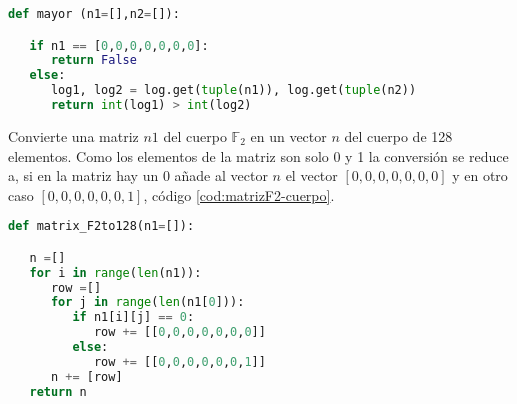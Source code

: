 \vspace{0.25cm}

\begin{lstlisting}[language=Python,caption=Compara dos elementos del cuerpo, label=cod:mayor-que-cuerpo]
def mayor (n1=[],n2=[]):

   if n1 == [0,0,0,0,0,0,0]:
      return False
   else:
      log1, log2 = log.get(tuple(n1)), log.get(tuple(n2))
      return int(log1) > int(log2)
\end{lstlisting}
 


Convierte una matriz $n1$ del cuerpo $\mathds{F}_2$ en un vector $n$ del cuerpo de 128 elementos. Como los elementos de la matriz son solo 0 y 1 la conversión se reduce a, si en la matriz hay un 0 añade al vector $n$ el vector $[0,0,0,0,0,0,0]$ y en otro caso $[0,0,0,0,0,0,1]$, código \ref{cod:matrizF2-cuerpo}.

\begin{table}[h]
	\begin{center}
	\centering
	\end{center}
	\caption{Parámetros de la función \texttt{matrix\_F2to128}}
\end{table}

\vspace{0.25cm}
\begin{lstlisting}[language=Python,caption=Matriz de $\mathds{F}_2$ a un elemento del cuerpo 128 elementos, label=cod:matrizF2-cuerpo]
def matrix_F2to128(n1=[]):

   n =[]
   for i in range(len(n1)):
      row =[]
      for j in range(len(n1[0])):
         if n1[i][j] == 0:
            row += [[0,0,0,0,0,0,0]]
         else:
            row += [[0,0,0,0,0,0,1]]
      n += [row]
   return n
\end{lstlisting}


